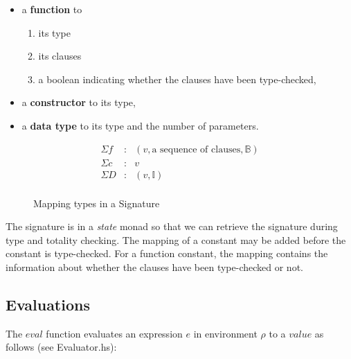 \documentclass[acmsmall]{acmart}
\begin{document}
\begin{itemize}
  \item a \textbf{function} to
        \begin{enumerate}
          \item its type
          \item its clauses
          \item a boolean indicating whether the clauses have been type-checked,
        \end{enumerate}
  \item a \textbf{constructor} to its type,
  \item a \textbf{data type} to its type and the number of parameters.
\end{itemize}

\begin{figure}[H]
  \begin{equation*}
    \begin{aligned}
      \Sigma f & : & (v, \textrm{a sequence of clauses}, \mathbb{B}) \\
      \Sigma c & : & v                                               \\
      \Sigma D & : & (v, \mathbb{I})                                 \\
    \end{aligned}
  \end{equation*}
  \caption{Mapping types in a Signature}
\end{figure}

The signature is in a \textit{state} monad so that we can retrieve the signature during type and totality checking. The mapping of a constant may be added before the constant is type-checked. For a function constant, the mapping contains the information about whether the clauses have been type-checked or not.

\subsection{Evaluations}

The $eval$ function evaluates an expression $e$ in environment $\rho$ to a
$value$ as follows (see Evaluator.hs):
\end{document}
